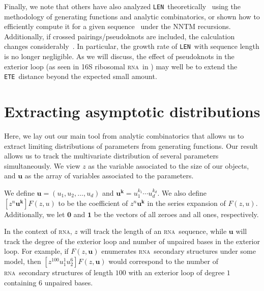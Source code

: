 \documentclass{article}
\newcommand{\RNA}{\textsc{rna}}
\newcommand{\rna}{\textsc{rna}}
\newcommand{\ETE}{{\tt ETE}}
\newcommand{\LEN}{{\tt LEN}}
\begin{document}
Finally, we note that
others have also analyzed \LEN\ theoretically~\cite{Han:2012}
using the methodology of generating functions and 
analytic combinatorics,
or shown how to efficiently compute it for a given 
sequence~\cite{Mori:2014} under the NNTM recursions.
Additionally, if crossed pairings/pseudoknots are included,
the calculation changes considerably~\cite{Fang:2011}.
In particular, the growth rate of \LEN\ with sequence length 
is no longer negligible.
As we will discuss, the effect of pseudoknots in the exterior loop
(as seen in 16S ribosomal \RNA\ in )
may well be to extend the \ETE\ distance beyond the expected small amount.


\section{Extracting asymptotic distributions} \label{sec:Analytic}

Here, we lay out our main tool from analytic combinatorics that allows us to extract limiting distributions of parameters from generating functions.  Our result allows us to track the multivariate distribution of several parameters simultaneously.  We view $z$ as the variable associated to the size of our objects, and $\mathbf{u}$ as the array of variables associated to the parameters. 

We define $\mathbf{u} = (u_1, u_2, \ldots, u_d)$ and $\mathbf{u}^\mathbf{k} = u_1^{k_1} \cdots u_d^{k_d}$.  We also define $[z^n \mathbf{u}^{\mathbf{k}}]F(z, u)$ to be the coefficient of $z^n \mathbf{u}^{\mathbf{k}}$ in the series expansion of $F(z, u)$.  Additionally, we let $\mathbf{0}$ and $\mathbf{1}$ be the vectors of all zeroes and all ones, respectively.

In the context of \rna, $z$ will track the length of an \rna\ sequence, while $\mathbf{u}$ will track the degree of the exterior loop and number of unpaired bases in the exterior loop. For example, if $F(z, \mathbf{u})$ enumerates \rna\ secondary structures under some model, then $[z^{100} u_1^{1} u_2^{6}] F(z, \mathbf{u})$ would correspond to the number of \rna\ secondary structures of length $100$ with an exterior loop of degree $1$ containing $6$ unpaired bases.
\end{document}
